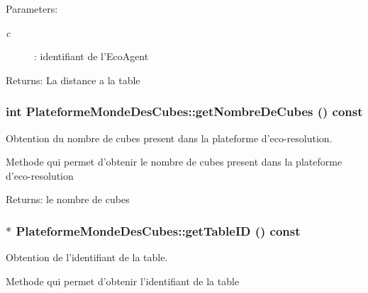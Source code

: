 \begin{Desc}
\item[Parameters:]
\begin{description}
\item[{\em c}]: identifiant de l'EcoAgent \end{description}
\end{Desc}
\begin{Desc}
\item[Returns:]La distance a la table \end{Desc}
\hypertarget{classPlateformeMondeDesCubes_a341731830c30c695d5ef80c90377165}{
\subsubsection[{getNombreDeCubes}]{\setlength{\rightskip}{0pt plus 5cm}int PlateformeMondeDesCubes::getNombreDeCubes () const}}
\label{classPlateformeMondeDesCubes_a341731830c30c695d5ef80c90377165}


Obtention du nombre de cubes present dans la plateforme d'eco-resolution. 

Methode qui permet d'obtenir le nombre de cubes present dans la plateforme d'eco-resolution

\begin{Desc}
\item[Returns:]le nombre de cubes \end{Desc}
\hypertarget{classPlateformeMondeDesCubes_232d0a6c6cbd1bc2d8622fa92dd64ce1}{
\subsubsection[{getTableID}]{ $\ast$ PlateformeMondeDesCubes::getTableID () const}}
\label{classPlateformeMondeDesCubes_232d0a6c6cbd1bc2d8622fa92dd64ce1}


Obtention de l'identifiant de la table. 

Methode qui permet d'obtenir l'identifiant de la table

